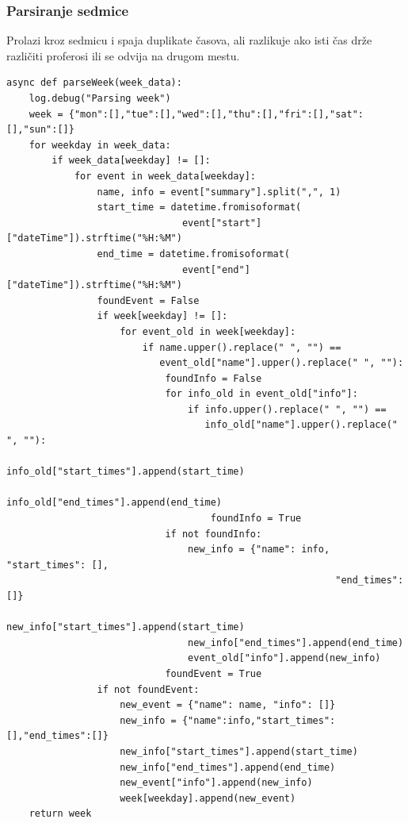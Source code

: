 \documentclass[a4paper,11pt]{article}
\begin{document}
\subsubsection{Parsiranje sedmice}
Prolazi kroz sedmicu i spaja duplikate časova, ali razlikuje ako isti čas drže različiti proferosi ili se odvija na drugom mestu.
\begin{verbatim}
async def parseWeek(week_data):
    log.debug("Parsing week")
    week = {"mon":[],"tue":[],"wed":[],"thu":[],"fri":[],"sat":[],"sun":[]}
    for weekday in week_data:
        if week_data[weekday] != []:
            for event in week_data[weekday]:
                name, info = event["summary"].split(",", 1)
                start_time = datetime.fromisoformat(
                               event["start"]["dateTime"]).strftime("%H:%M")
                end_time = datetime.fromisoformat(
                               event["end"]["dateTime"]).strftime("%H:%M")
                foundEvent = False
                if week[weekday] != []:
                    for event_old in week[weekday]:
                        if name.upper().replace(" ", "") == 
                           event_old["name"].upper().replace(" ", ""):
                            foundInfo = False
                            for info_old in event_old["info"]:
                                if info.upper().replace(" ", "") == 
                                   info_old["name"].upper().replace(" ", ""):
                                    info_old["start_times"].append(start_time)
                                    info_old["end_times"].append(end_time)
                                    foundInfo = True
                            if not foundInfo:
                                new_info = {"name": info, "start_times": [],
                                                          "end_times": []}
                                new_info["start_times"].append(start_time)
                                new_info["end_times"].append(end_time)
                                event_old["info"].append(new_info)
                            foundEvent = True
                if not foundEvent:
                    new_event = {"name": name, "info": []}
                    new_info = {"name":info,"start_times":[],"end_times":[]}
                    new_info["start_times"].append(start_time)
                    new_info["end_times"].append(end_time)
                    new_event["info"].append(new_info)
                    week[weekday].append(new_event)
    return week
\end{verbatim}
\newpage
\end{document}
